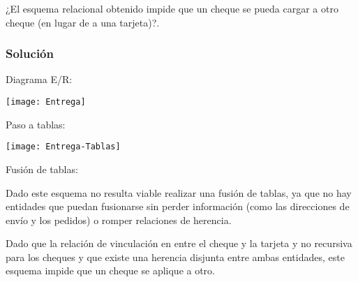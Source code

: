 ¿El esquema relacional obtenido impide que un cheque se pueda cargar a otro cheque (en lugar de a una tarjeta)?.

\pagebreak

\subsubsection{Solución}

Diagrama E/R\@:

\begin{center}
	\texttt{[image: Entrega]}
\end{center}

Paso a tablas:

\begin{center}
	\texttt{[image: Entrega-Tablas]}
\end{center}

Fusión de tablas:

Dado este esquema no resulta viable realizar una fusión de tablas, ya que no hay entidades que puedan fusionarse sin perder información (como las direcciones de envío y los pedidos) o romper relaciones de herencia.

Dado que la relación de vinculación en entre el cheque y la tarjeta y no recursiva para los cheques y que existe una herencia disjunta entre ambas entidades, este esquema impide que un cheque se aplique a otro.
